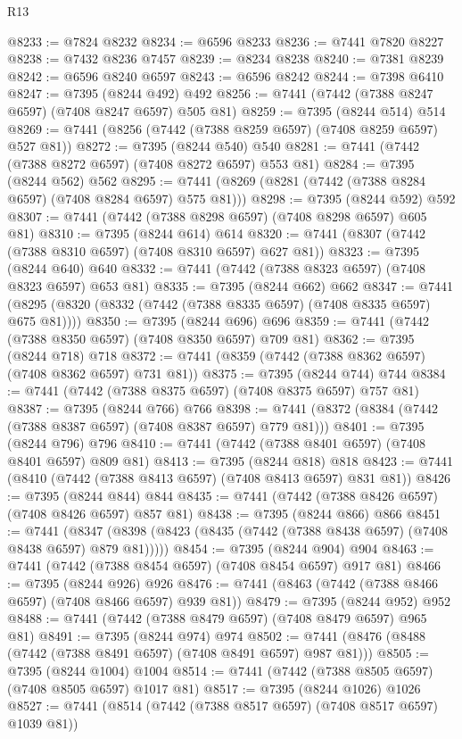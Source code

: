\begin{lexlean}{R13}
\begin{coremodule}
@8233 := @7824 @8232
@8234 := @6596 @8233
@8236 := @7441 @7820 @8227
@8238 := @7432 @8236 @7457
@8239 := @8234 @8238
@8240 := @7381 @8239
@8242 := @6596 @8240 @6597
@8243 := @6596 @8242
@8244 := @7398 @6410
@8247 := @7395 (@8244 @492) @492
@8256 := @7441 (@7442 (@7388 @8247 @6597) (@7408 @8247 @6597) @505 @81)
@8259 := @7395 (@8244 @514) @514
@8269 := @7441 (@8256 (@7442 (@7388 @8259 @6597) (@7408 @8259 @6597) @527 @81))
@8272 := @7395 (@8244 @540) @540
@8281 := @7441 (@7442 (@7388 @8272 @6597) (@7408 @8272 @6597) @553 @81)
@8284 := @7395 (@8244 @562) @562
@8295 := @7441 (@8269 (@8281 (@7442 (@7388 @8284 @6597) (@7408 @8284 @6597) @575 @81)))
@8298 := @7395 (@8244 @592) @592
@8307 := @7441 (@7442 (@7388 @8298 @6597) (@7408 @8298 @6597) @605 @81)
@8310 := @7395 (@8244 @614) @614
@8320 := @7441 (@8307 (@7442 (@7388 @8310 @6597) (@7408 @8310 @6597) @627 @81))
@8323 := @7395 (@8244 @640) @640
@8332 := @7441 (@7442 (@7388 @8323 @6597) (@7408 @8323 @6597) @653 @81)
@8335 := @7395 (@8244 @662) @662
@8347 := @7441 (@8295 (@8320 (@8332 (@7442 (@7388 @8335 @6597) (@7408 @8335 @6597) @675 @81))))
@8350 := @7395 (@8244 @696) @696
@8359 := @7441 (@7442 (@7388 @8350 @6597) (@7408 @8350 @6597) @709 @81)
@8362 := @7395 (@8244 @718) @718
@8372 := @7441 (@8359 (@7442 (@7388 @8362 @6597) (@7408 @8362 @6597) @731 @81))
@8375 := @7395 (@8244 @744) @744
@8384 := @7441 (@7442 (@7388 @8375 @6597) (@7408 @8375 @6597) @757 @81)
@8387 := @7395 (@8244 @766) @766
@8398 := @7441 (@8372 (@8384 (@7442 (@7388 @8387 @6597) (@7408 @8387 @6597) @779 @81)))
@8401 := @7395 (@8244 @796) @796
@8410 := @7441 (@7442 (@7388 @8401 @6597) (@7408 @8401 @6597) @809 @81)
@8413 := @7395 (@8244 @818) @818
@8423 := @7441 (@8410 (@7442 (@7388 @8413 @6597) (@7408 @8413 @6597) @831 @81))
@8426 := @7395 (@8244 @844) @844
@8435 := @7441 (@7442 (@7388 @8426 @6597) (@7408 @8426 @6597) @857 @81)
@8438 := @7395 (@8244 @866) @866
@8451 := @7441
    (@8347 (@8398 (@8423 (@8435 (@7442 (@7388 @8438 @6597) (@7408 @8438 @6597) @879 @81)))))
@8454 := @7395 (@8244 @904) @904
@8463 := @7441 (@7442 (@7388 @8454 @6597) (@7408 @8454 @6597) @917 @81)
@8466 := @7395 (@8244 @926) @926
@8476 := @7441 (@8463 (@7442 (@7388 @8466 @6597) (@7408 @8466 @6597) @939 @81))
@8479 := @7395 (@8244 @952) @952
@8488 := @7441 (@7442 (@7388 @8479 @6597) (@7408 @8479 @6597) @965 @81)
@8491 := @7395 (@8244 @974) @974
@8502 := @7441 (@8476 (@8488 (@7442 (@7388 @8491 @6597) (@7408 @8491 @6597) @987 @81)))
@8505 := @7395 (@8244 @1004) @1004
@8514 := @7441 (@7442 (@7388 @8505 @6597) (@7408 @8505 @6597) @1017 @81)
@8517 := @7395 (@8244 @1026) @1026
@8527 := @7441 (@8514 (@7442 (@7388 @8517 @6597) (@7408 @8517 @6597) @1039 @81))

\end{coremodule}
\end{lexlean}
